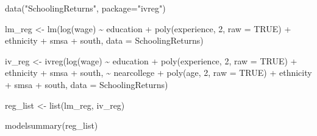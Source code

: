 \documentclass[
  letterpaper,
  DIV=11,
  numbers=noendperiod]{scrreprt}
\newenvironment{Shaded}{\begin{snugshade}}{\end{snugshade}}
\newcommand{\AttributeTok}[1]{\textcolor[rgb]{0.40,0.45,0.13}{#1}}
\newcommand{\ConstantTok}[1]{\textcolor[rgb]{0.56,0.35,0.01}{#1}}
\newcommand{\DecValTok}[1]{\textcolor[rgb]{0.68,0.00,0.00}{#1}}
\newcommand{\FunctionTok}[1]{\textcolor[rgb]{0.28,0.35,0.67}{#1}}
\newcommand{\NormalTok}[1]{\textcolor[rgb]{0.00,0.23,0.31}{#1}}
\newcommand{\OtherTok}[1]{\textcolor[rgb]{0.00,0.23,0.31}{#1}}
\newcommand{\SpecialCharTok}[1]{\textcolor[rgb]{0.37,0.37,0.37}{#1}}
\newcommand{\StringTok}[1]{\textcolor[rgb]{0.13,0.47,0.30}{#1}}
\begin{document}
\begin{Shaded}
\begin{Highlighting}[]
\FunctionTok{data}\NormalTok{(}\StringTok{"SchoolingReturns"}\NormalTok{, }\AttributeTok{package=}\StringTok{"ivreg"}\NormalTok{)}

\NormalTok{lm\_reg }\OtherTok{\textless{}{-}} \FunctionTok{lm}\NormalTok{(}\FunctionTok{log}\NormalTok{(wage) }\SpecialCharTok{\textasciitilde{}}\NormalTok{ education }\SpecialCharTok{+} \FunctionTok{poly}\NormalTok{(experience, }\DecValTok{2}\NormalTok{, }\AttributeTok{raw =} \ConstantTok{TRUE}\NormalTok{) }\SpecialCharTok{+}\NormalTok{ ethnicity }\SpecialCharTok{+}\NormalTok{ smsa }\SpecialCharTok{+}\NormalTok{ south,}
  \AttributeTok{data =}\NormalTok{ SchoolingReturns)}

\NormalTok{iv\_reg }\OtherTok{\textless{}{-}} \FunctionTok{ivreg}\NormalTok{(}\FunctionTok{log}\NormalTok{(wage) }\SpecialCharTok{\textasciitilde{}}\NormalTok{ education }\SpecialCharTok{+} \FunctionTok{poly}\NormalTok{(experience, }\DecValTok{2}\NormalTok{, }\AttributeTok{raw =} \ConstantTok{TRUE}\NormalTok{) }\SpecialCharTok{+}\NormalTok{ ethnicity }\SpecialCharTok{+}\NormalTok{ smsa }\SpecialCharTok{+}\NormalTok{ south, }
  \SpecialCharTok{\textasciitilde{}}\NormalTok{ nearcollege }\SpecialCharTok{+} \FunctionTok{poly}\NormalTok{(age, }\DecValTok{2}\NormalTok{, }\AttributeTok{raw =} \ConstantTok{TRUE}\NormalTok{) }\SpecialCharTok{+}\NormalTok{ ethnicity }\SpecialCharTok{+}\NormalTok{ smsa }\SpecialCharTok{+}\NormalTok{ south,}
  \AttributeTok{data =}\NormalTok{ SchoolingReturns)}

\NormalTok{reg\_list }\OtherTok{\textless{}{-}} \FunctionTok{list}\NormalTok{(lm\_reg, iv\_reg)}

\FunctionTok{modelsummary}\NormalTok{(reg\_list)}
\end{Highlighting}
\end{Shaded}
\end{document}
